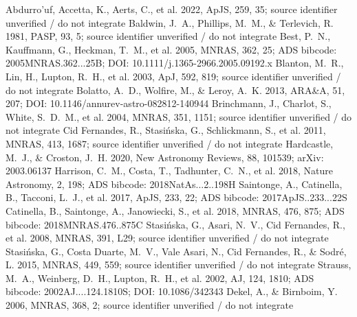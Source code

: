 \documentclass[twocolumn]{aastex631}
\begin{document}

\begin{thebibliography}{}
 Abdurro'uf, Accetta, K., Aerts, C., et al. 2022, ApJS, 259, 35; source identifier unverified / do not integrate
 Baldwin, J.~A., Phillips, M.~M., \& Terlevich, R. 1981, PASP, 93, 5; source identifier unverified / do not integrate
 Best, P.~N., Kauffmann, G., Heckman, T.~M., et al. 2005, MNRAS, 362, 25; ADS bibcode: 2005MNRAS.362...25B; DOI: 10.1111/j.1365-2966.2005.09192.x
 Blanton, M.~R., Lin, H., Lupton, R.~H., et al. 2003, ApJ, 592, 819; source identifier unverified / do not integrate
 Bolatto, A.~D., Wolfire, M., \& Leroy, A.~K. 2013, ARA\&A, 51, 207; DOI: 10.1146/annurev-astro-082812-140944
 Brinchmann, J., Charlot, S., White, S.~D.~M., et al. 2004, MNRAS, 351, 1151; source identifier unverified / do not integrate
 Cid Fernandes, R., Stasi{\'n}ska, G., Schlickmann, S., et al. 2011, MNRAS, 413, 1687; source identifier unverified / do not integrate
 Hardcastle, M.~J., \& Croston, J.~H. 2020, New Astronomy Reviews, 88, 101539; arXiv: 2003.06137
 Harrison, C.~M., Costa, T., Tadhunter, C.~N., et al. 2018, Nature Astronomy, 2, 198; ADS bibcode: 2018NatAs...2..198H
 Saintonge, A., Catinella, B., Tacconi, L.~J., et al. 2017, ApJS, 233, 22; ADS bibcode: 2017ApJS..233...22S
 Catinella, B., Saintonge, A., Janowiecki, S., et al. 2018, MNRAS, 476, 875; ADS bibcode: 2018MNRAS.476..875C
 Stasi{\'n}ska, G., Asari, N.~V., Cid Fernandes, R., et al. 2008, MNRAS, 391, L29; source identifier unverified / do not integrate
 Stasi{\'n}ska, G., Costa Duarte, M.~V., Vale Asari, N., Cid Fernandes, R., \& Sodr{\'e}, L. 2015, MNRAS, 449, 559; source identifier unverified / do not integrate
 Strauss, M.~A., Weinberg, D.~H., Lupton, R.~H., et al. 2002, AJ, 124, 1810; ADS bibcode: 2002AJ....124.1810S; DOI: 10.1086/342343
 Dekel, A., \& Birnboim, Y. 2006, MNRAS, 368, 2; source identifier unverified / do not integrate

\end{thebibliography}
\end{document}

